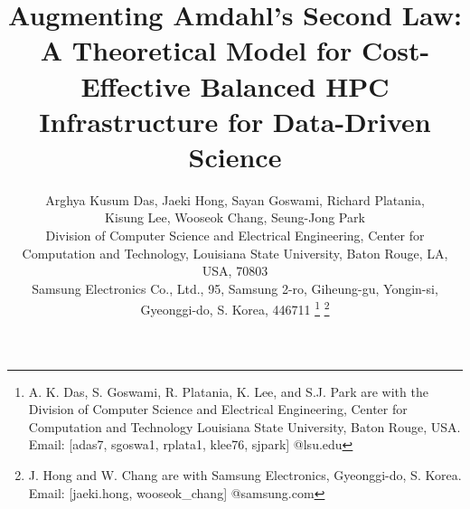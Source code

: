 \documentclass[journal]{IEEEtran}
\begin{document}
%
\title{Augmenting Amdahl's Second Law:  A Theoretical Model for Cost-Effective Balanced HPC Infrastructure for Data-Driven Science}
%
%
%

\author{
Arghya Kusum Das, %
Jaeki Hong, %
Sayan Goswami,
Richard Platania,\\
Kisung Lee, %
Wooseok Chang,
Seung-Jong Park \\
Division of Computer Science and Electrical Engineering, Center for Computation and Technology, Louisiana State University, Baton Rouge, LA, USA, 70803\\
Samsung Electronics Co., Ltd., 95, Samsung 2-ro, Giheung-gu, Yongin-si, Gyeonggi-do, S. Korea, 446711
\thanks{A. K. Das, S. Goswami, R. Platania, K. Lee, and S.J. Park are with the Division of Computer Science and Electrical Engineering, Center for Computation and Technology Louisiana State University, Baton Rouge, USA. Email: [adas7, sgoswa1, rplata1, klee76, sjpark] @lsu.edu}
\thanks{J. Hong and W. Chang are with Samsung Electronics, Gyeonggi-do, S. Korea. Email: [jaeki.hong, wooseok\_chang] @samsung.com}
}
\end{document}
